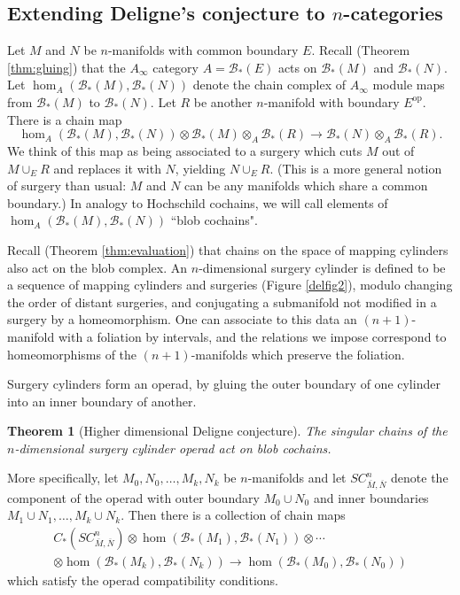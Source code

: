 \documentclass{pnastwo}
\def\bc{{\mathcal B}}
\def\ot{\otimes}
\newtheorem{thm}[prop]{Theorem}
\begin{document}
\begin{article}
\section{Extending Deligne's conjecture to $n$-categories}
\label{sec:applications}

Let $M$ and $N$ be $n$-manifolds with common boundary $E$.
Recall (Theorem \ref{thm:gluing}) that the $A_\infty$ category $A = \bc_*(E)$
acts on $\bc_*(M)$ and $\bc_*(N)$.
Let $\hom_A(\bc_*(M), \bc_*(N))$ denote the chain complex of $A_\infty$ module maps
from $\bc_*(M)$ to $\bc_*(N)$.
Let $R$ be another $n$-manifold with boundary $E^\text{op}$.
There is a chain map
\begin{equation*}
	\hom_A(\bc_*(M), \bc_*(N)) \ot \bc_*(M) \ot_A \bc_*(R) \to \bc_*(N) \ot_A \bc_*(R) .
\end{equation*}
We think of this map as being associated to a surgery which cuts $M$ out of $M\cup_E R$ and
replaces it with $N$, yielding $N\cup_E R$.
(This is a more general notion of surgery than usual: $M$ and $N$ can be any manifolds
which share a common boundary.)
In analogy to Hochschild cochains, we will call elements of $\hom_A(\bc_*(M), \bc_*(N))$ ``blob cochains".

Recall (Theorem \ref{thm:evaluation}) that chains on the space of mapping cylinders also act on the 
blob complex.
An $n$-dimensional surgery cylinder is 
defined to be a sequence of mapping cylinders and surgeries (Figure \ref{delfig2}), 
modulo changing the order of distant surgeries, and conjugating a submanifold not modified in a surgery by a homeomorphism. 
One can associate to this data an $(n{+}1)$-manifold with a foliation by intervals,
and the relations we impose correspond to homeomorphisms of the $(n{+}1)$-manifolds
which preserve the foliation.

Surgery cylinders form an operad, by gluing the outer boundary of one cylinder into an inner boundary of another.

\begin{thm}[Higher dimensional Deligne conjecture]
\label{thm:deligne}
The singular chains of the $n$-dimensional surgery cylinder operad act on blob cochains.
\end{thm}

More specifically, let $M_0, N_0, \ldots, M_k, N_k$ be $n$-manifolds and let $SC^n_{\overline{M}, \overline{N}}$
denote the component of the operad with outer boundary $M_0\cup N_0$ and inner boundaries
$M_1\cup N_1,\ldots, M_k\cup N_k$.
Then there is a collection of chain maps
\begin{multline*}
	C_*(SC^n_{\overline{M}, \overline{N}})\otimes \hom(\bc_*(M_1), \bc_*(N_1))\otimes\cdots \\
		\otimes \hom(\bc_*(M_{k}), \bc_*(N_{k})) \to  \hom(\bc_*(M_0), \bc_*(N_0))
\end{multline*}
which satisfy the operad compatibility conditions.


\end{article}
\end{document}
